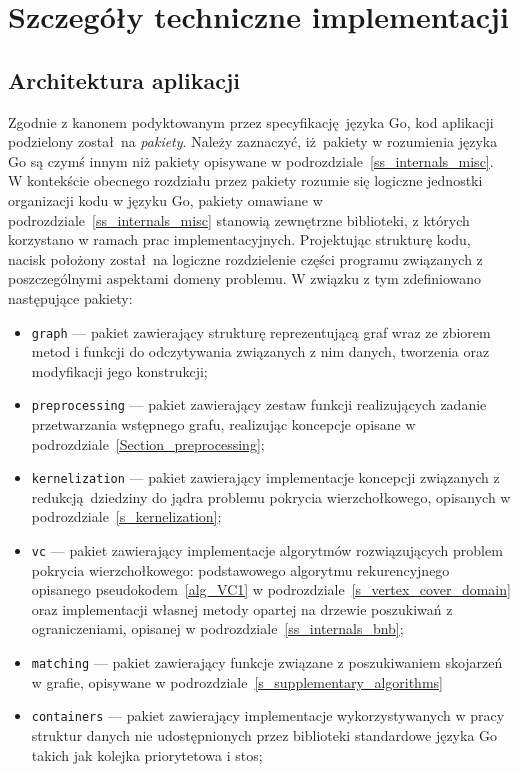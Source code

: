 \section{Szczegóły techniczne implementacji}\label{s_internals_implementation}
\subsection{Architektura aplikacji}\label{ss_internals_architecture}
\par{
  Zgodnie z kanonem podyktowanym przez specyfikację języka Go, kod aplikacji podzielony został na \emph{pakiety}.
  Należy zaznaczyć, iż pakiety w rozumienia języka Go są czymś innym niż pakiety opisywane w podrozdziale~\ref{ss_internals_misc}.
  W kontekście obecnego rozdziału przez pakiety rozumie się logiczne jednostki organizacji kodu w języku Go, pakiety omawiane w podrozdziale~\ref{ss_internals_misc} stanowią zewnętrzne biblioteki, z których korzystano w ramach prac implementacyjnych.
  Projektując strukturę kodu, nacisk położony został na logiczne rozdzielenie części programu związanych z poszczególnymi aspektami domeny problemu.
  W związku z tym zdefiniowano następujące pakiety:
  \begin{itemize}
    \item \texttt{graph} --- pakiet zawierający strukturę reprezentującą graf wraz ze zbiorem metod i funkcji do odczytywania związanych z nim danych, tworzenia oraz modyfikacji jego konstrukcji;
    \item \texttt{preprocessing} --- pakiet zawierający zestaw funkcji realizujących zadanie przetwarzania wstępnego grafu, realizując koncepcje opisane w podrozdziale~\ref{Section_preprocessing};
    \item \texttt{kernelization} --- pakiet zawierający implementacje koncepcji związanych z redukcją dziedziny do jądra problemu pokrycia wierzchołkowego, opisanych w podrozdziale~\ref{s_kernelization};
    \item \texttt{vc} --- pakiet zawierający implementacje algorytmów rozwiązujących problem pokrycia wierzchołkowego: podstawowego algorytmu rekurencyjnego opisanego pseudokodem~\ref{alg_VC1} w podrozdziale~\ref{s_vertex_cover_domain} oraz implementacji własnej metody opartej na drzewie poszukiwań z ograniczeniami, opisanej w podrozdziale~\ref{ss_internals_bnb};
    \item \texttt{matching} --- pakiet zawierający funkcje związane z poszukiwaniem skojarzeń w grafie, opisywane w podrozdziale~\ref{s_supplementary_algorithms}
    \item \texttt{containers} --- pakiet zawierający implementacje wykorzystywanych w pracy struktur danych nie udostępnionych przez biblioteki standardowe języka Go takich jak kolejka priorytetowa i stos;

\end{itemize}}
